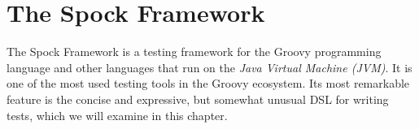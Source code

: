 \chapter{The Spock Framework}\label{chap:Spock}
The Spock Framework is a testing framework for the Groovy programming language
and other languages that run on the \textit{Java Virtual Machine (JVM)}.
\autocite{SpockFrameworkDoc}
It is one of the most used testing tools in the Groovy ecosystem.
\autocite[Chapter 3.6: Testing Guide]{GroovyDoc}
Its most remarkable feature is the concise and expressive,
but somewhat unusual DSL for writing tests,
which we will examine in this chapter.












